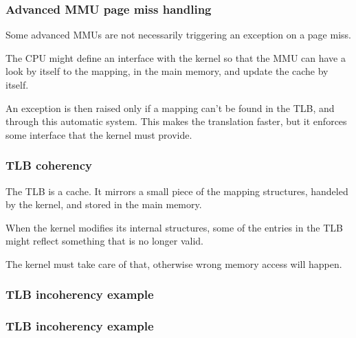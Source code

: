 \begin{frame}
  \frametitle{Advanced MMU page miss handling}

  Some advanced MMUs are not necessarily triggering an exception on a page miss.

  \-

  The CPU might define an interface with the kernel so that the MMU can have a look by itself to the mapping, in the main memory, and update the cache by itself.

  \-

  An exception is then raised only if a mapping can't be found in the TLB, and through this automatic system. This makes the translation faster, but it enforces some interface that the kernel must provide.

\end{frame}


\begin{frame}
  \frametitle{TLB coherency}

  The TLB is a cache. It mirrors a small piece of the mapping structures, handeled by the kernel, and stored in the main memory.

  \-

  When the kernel modifies its internal structures, some of the entries in the TLB might reflect something that is no longer valid.

  \-

  The kernel must take care of that, otherwise wrong memory access will happen.

\end{frame}

\begin{frame}
  \frametitle{TLB incoherency example}

  \begin{center}
  \end{center}

\end{frame}

\begin{frame}
  \frametitle{TLB incoherency example}

  \begin{center}
  \end{center}

\end{frame}

